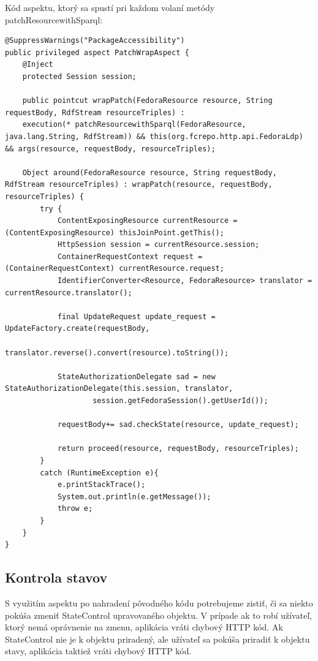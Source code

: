 \documentclass[thesis=M,slovak]{FITthesis}[2013/05/06]
\begin{document}
Kód aspektu, ktorý sa spustí pri každom volaní metódy patchResourcewithSparql:
\lstset{language=Java}
\begin{lstlisting}[frame=single] 
@SuppressWarnings("PackageAccessibility")
public privileged aspect PatchWrapAspect {
    @Inject
    protected Session session;

    public pointcut wrapPatch(FedoraResource resource, String requestBody, RdfStream resourceTriples) :
    execution(* patchResourcewithSparql(FedoraResource, java.lang.String, RdfStream)) && this(org.fcrepo.http.api.FedoraLdp) && args(resource, requestBody, resourceTriples);

    Object around(FedoraResource resource, String requestBody, RdfStream resourceTriples) : wrapPatch(resource, requestBody, resourceTriples) {
        try {
            ContentExposingResource currentResource = (ContentExposingResource) thisJoinPoint.getThis();
            HttpSession session = currentResource.session;
            ContainerRequestContext request = (ContainerRequestContext) currentResource.request;
            IdentifierConverter<Resource, FedoraResource> translator = currentResource.translator();

            final UpdateRequest update_request = UpdateFactory.create(requestBody,
                    translator.reverse().convert(resource).toString());

            StateAuthorizationDelegate sad = new StateAuthorizationDelegate(this.session, translator,
                    session.getFedoraSession().getUserId());

            requestBody+= sad.checkState(resource, update_request);

            return proceed(resource, requestBody, resourceTriples);
        }
        catch (RuntimeException e){
            e.printStackTrace();
            System.out.println(e.getMessage());
            throw e;
        }
    }
}
\end{lstlisting}

\subsection{Kontrola stavov}
S využitím aspektu po nahradení pôvodného kódu potrebujeme zistiť, či sa niekto pokúša zmeniť StateControl upravovaného objektu. V prípade ak to robí užívateľ, ktorý nemá oprávnenie na zmenu, aplikácia vráti chybový HTTP kód.
Ak StateControl nie je k objektu priradený, ale užívateľ sa pokúša priradiť k objektu stavy, aplikácia taktiež vráti chybový HTTP kód.
\end{document}

